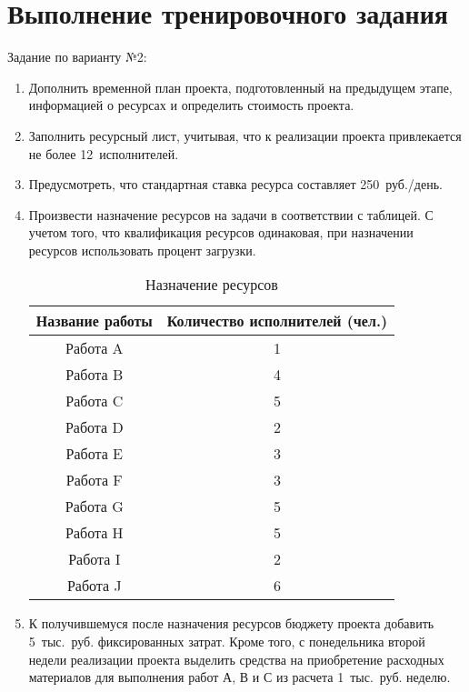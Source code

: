 \section{Выполнение тренировочного задания}

Задание по варианту №2:

\begin{enumerate}
    \item Дополнить временной план проекта, подготовленный на предыдущем этапе,
	    информацией о ресурсах и определить стоимость проекта.

    \item Заполнить ресурсный лист, учитывая, что к реализации проекта
	    привлекается не более 12~исполнителей. 

    \item Предусмотреть, что стандартная ставка ресурса составляет
	    250~руб./день.

    \item Произвести назначение ресурсов на задачи в соответствии с таблицей. С
        учетом того, что квалификация ресурсов одинаковая, при назначении
        ресурсов использовать процент загрузки. 

    {
    \fontsize{12pt}{12pt}\selectfont
    \captionsetup{format=hang,justification=raggedleft,
                  singlelinecheck=off,width=17cm}
    \begin{longtable}[Hc]{|c|c|}
    \caption{Назначение ресурсов}\\
        \hline
        Название работы & Количество исполнителей (чел.)\\
        \hline
        Работа A & 1\\
        \hline
        Работа B & 4\\
        \hline
        Работа C & 5\\
        \hline
        Работа D & 2\\
        \hline
        Работа E & 3\\
        \hline
        Работа F & 3\\
        \hline
        Работа G & 5\\
        \hline
        Работа H & 5\\
        \hline
        Работа I & 2\\
        \hline
        Работа J & 6\\
        \hline
    \end{longtable}
    }

    \item К получившемуся после назначения ресурсов бюджету проекта добавить
        5~тыс.~руб. фиксированных затрат. Кроме того, с понедельника второй
        недели реализации проекта выделить средства на приобретение расходных
        материалов для выполнения работ А, В и С из расчета 1~тыс.~руб. неделю.
\end{enumerate}

